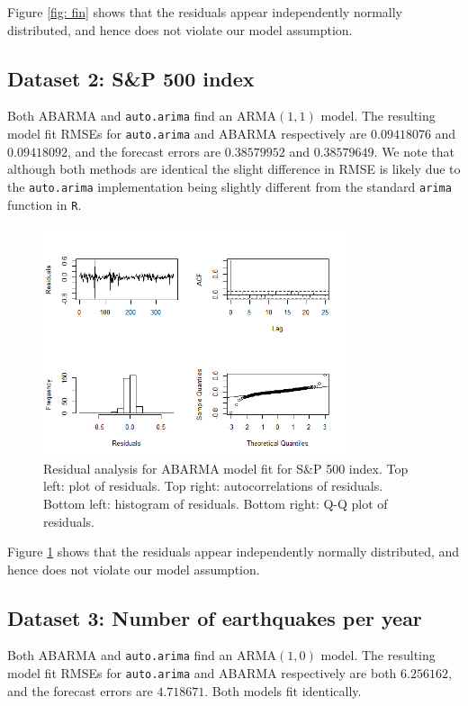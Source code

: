 Figure \ref{fig: fin} shows that the residuals appear independently normally distributed, and hence does not violate our model assumption.

\subsection{Dataset 2: S\&P 500 index}


Both ABARMA and {\tt auto.arima} find an ARMA$(1,1)$ model.  The resulting model fit RMSEs for  {\tt auto.arima} and ABARMA respectively are  $0.09418076$ and  $0.09418092$, and the forecast errors are $0.38579952$ and $0.38579649$.  We note that although both methods are identical the slight difference in RMSE is likely due to the {\tt auto.arima} implementation being slightly different from the standard {\tt arima} function in {\tt R}.


\begin{figure}[h]
    \centering
    \includegraphics[width=3.5in]{daignostics_sp500.png}
    \caption{Residual analysis for ABARMA model fit for S\&P 500 index. Top left: plot of residuals. Top right: autocorrelations of residuals. Bottom left: histogram of residuals. Bottom right: Q-Q plot of residuals.}
    \label{fig: sp500}
\end{figure}

Figure \ref{fig: sp500} shows that the residuals appear independently normally distributed, and hence does not violate our model assumption.

\subsection{Dataset 3: Number of earthquakes per year}

Both ABARMA and {\tt auto.arima} find an ARMA$(1,0)$ model.  The resulting model fit RMSEs for  {\tt auto.arima} and ABARMA respectively are  both $6.256162$, and the forecast errors are $4.718671$.  Both models fit identically.

